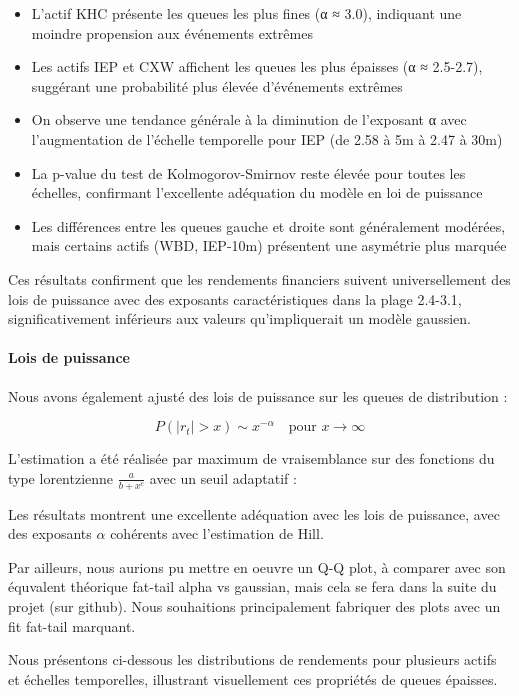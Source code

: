 \documentclass[10pt,a4paper]{article}
\theoremstyle{definition}
\theoremstyle{remark}
\begin{document}
\begin{itemize}
\begin{itemize}
    \item L'actif KHC présente les queues les plus fines (α ≈ 3.0), indiquant une moindre propension aux événements extrêmes
    \item Les actifs IEP et CXW affichent les queues les plus épaisses (α ≈ 2.5-2.7), suggérant une probabilité plus élevée d'événements extrêmes
    \item On observe une tendance générale à la diminution de l'exposant α avec l'augmentation de l'échelle temporelle pour IEP (de 2.58 à 5m à 2.47 à 30m)
    \item La p-value du test de Kolmogorov-Smirnov reste élevée pour toutes les échelles, confirmant l'excellente adéquation du modèle en loi de puissance
    \item Les différences entre les queues gauche et droite sont généralement modérées, mais certains actifs (WBD, IEP-10m) présentent une asymétrie plus marquée
\end{itemize}

Ces résultats confirment que les rendements financiers suivent universellement des lois de puissance avec des exposants caractéristiques dans la plage 2.4-3.1, significativement inférieurs aux valeurs qu'impliquerait un modèle gaussien.

\paragraph{Lois de puissance}
Nous avons également ajusté des lois de puissance sur les queues de distribution :

\begin{equation}
P(|r_t| > x) \sim x^{-\alpha} \quad \text{pour } x \to \infty
\end{equation}

L'estimation a été réalisée par maximum de vraisemblance sur des fonctions du type lorentzienne $\frac{a}{b+x^c}$ avec un seuil adaptatif :

Les résultats montrent une excellente adéquation avec les lois de puissance, avec des exposants $\alpha$ cohérents avec l'estimation de Hill.

Par ailleurs, nous aurions pu mettre en oeuvre un Q-Q plot, à comparer avec son équvalent théorique fat-tail alpha vs gaussian, mais cela se fera dans la suite du projet (sur github).
Nous souhaitions principalement fabriquer des plots avec un fit fat-tail marquant.

Nous présentons ci-dessous les distributions de rendements pour plusieurs actifs et échelles temporelles, illustrant visuellement ces propriétés de queues épaisses.


\end{itemize}
\end{document}
